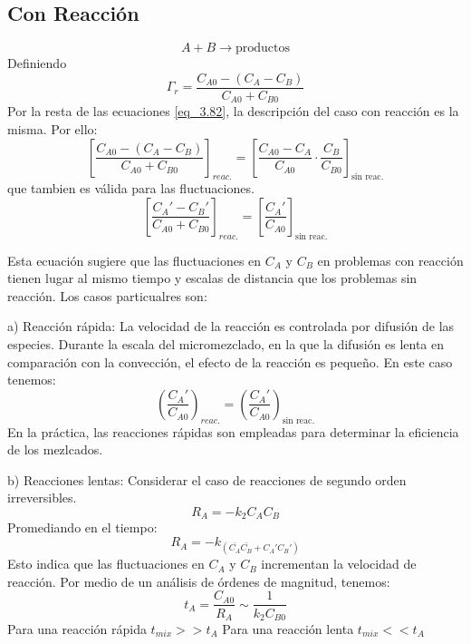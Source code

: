 \subsection{Con Reacción}
\begin{equation*}
    A + B \rightarrow \text{productos}
\end{equation*}
Definiendo
\begin{equation}
    \Gamma_{r}=\frac{C_{A0}-(C_A-C_B)}{C_{A0}+C_{B0}}
\end{equation}
Por la resta de las ecuaciones \eqref{eq_3.82}, la descripción del caso con reacción es la misma. Por ello:
\begin{equation}
    \left[ \frac{C_{A0}-(C_A-C_B)}{C_{A0}+C_{B0}} \right]_{reac.}=   \left[ \frac{C_{A0}-C_A}{C_{A0}}\cdot\frac{C_B}{C_{B0}} \right]_{\text{sin reac.} }
\end{equation}
que tambien es válida para las fluctuaciones.
\begin{equation}
        \left[ \frac{C_A'-C_B'}{C_{A0}+C_{B0}} \right]_{reac.}=  \left[ \frac{C_A'}{C_{A0}} \right]_{\text{sin reac.} }
\end{equation}

Esta ecuación sugiere que las fluctuaciones en $C_A$ y $C_B$ en problemas con reacción tienen lugar al mismo tiempo y escalas de distancia que los problemas sin reacción. Los casos particualres son:
\par
a) Reacción rápida: La velocidad de la reacción es controlada por difusión de las especies. Durante la escala del micromezclado, en la que la difusión es lenta en comparación con la convección, el efecto de la reacción es pequeño. En este caso tenemos:
\begin{equation}
            \left( \frac{C_A'}{C_{A0}} \right)_{reac.}=  \left( \frac{C_A'}{C_{A0}} \right)_{\text{sin reac.} }
\end{equation}
En la práctica, las reacciones rápidas son empleadas para determinar la eficiencia de los mezlcados.
\par
b) Reacciones lentas: Considerar el caso de reacciones de segundo orden irreversibles.
\begin{equation}
    R_A=-k_2C_AC_B
\end{equation}
Promediando en el tiempo: 
\begin{equation}
    R_A=-k_(\bar{C_A}\bar{C_B}+C_A'C_B')
\end{equation}
Esto indica que las fluctuaciones en $C_A$ y $C_B$ incrementan la velocidad de reacción. Por medio de un análisis de órdenes de magnitud, tenemos:
\begin{equation}
    t_A=\frac{C_{A0}}{R_A}\sim\frac{1}{k_2C_{B0}}
\end{equation}
Para una reacción rápida $t_{mix}>>t_A$ \newline
Para una reacción lenta $t_{mix}<<t_A$



